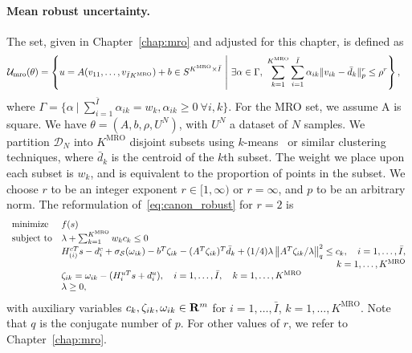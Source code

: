 \paragraph{Mean robust uncertainty.}
The  set, given in Chapter~\ref{chap:mro} and adjusted for this chapter, is defined as 
\begin{equation*}
	\begin{aligned}
		{\mathcal{U}}_{\text{mro}}(\theta) & = \left\{ u = A(v_{11},\dots,v_{\bar{I}K^{\text{MRO}}})+ b\in S^{K^{\text{MRO}}\times \bar{I}}~\middle|~\exists \alpha \in \Gamma,~\sum_{k=1}^{K^{\text{MRO}}} \sum_{i=1}^{\bar{I}} \alpha_{ik} \| v_{ik} - \bar{d}_k \|^r_p \le \rho^r \right\},
	\end{aligned}
\end{equation*}
where $\Gamma = \{\alpha~|~\sum_{i=1}^{\bar{I}}\alpha_{ik}= w_k, \alpha_{ik}\geq 0 ~\forall i,k\}$. For the MRO set, we assume A is square. We have $\theta = (A, b,\rho,U^N)$, with $U^N$ a dataset of $N$ samples. We partition ${\mathcal{D}}_N$ into $K^{\text{MRO}}$ disjoint subsets using $k$-means~\cite{kmeans} or similar clustering techniques, where $\bar{d}_k$ is the centroid of the $k$th subset. The weight we place upon each subset is $w_k$, and is equivalent to the proportion of points in the subset. We choose $r$ to be an integer exponent $r \in [1,\infty)$ or $r = \infty$, and $p$ to be an arbitrary norm. The reformulation of~\eqref{eq:canon_robust} for $r = 2$ is 
\begin{equation}
	\label{eq:mro_max}
	\begin{aligned}
		\begin{array}{ll}
			\text{minimize } & f(s)\\
			\mbox{subject to} & \lambda + \sum_{k=1}^{K^{\text{MRO}}} w_{k} c_{k}  \le 0\\
			& H^{cT}_{(i)}s - d_i^c + \sigma_\supp(\om_{ik}) - b^T\zeta_{ik} - (A^T\zeta_{ik})^T\bar{d}_k  + (1/4)\lambda \left\|A^T\zeta_{ik}/\lambda \right\|^2_q \leq c_k, \quad i = 1,\dots, \bar{I}, \\
   &\hfill \quad k = 1,\dots, K^{\text{MRO}}\\
			& \zeta_{ik} = \om_{ik} - (H_i^{uT}s + d_i^u), \quad i = 1,\dots, \bar{I},\quad k = 1,\dots, K^{\text{MRO}}\\
			& \lambda \geq 0,
		\end{array}
	\end{aligned}
\end{equation}
with auxiliary variables $c_k, \zeta_{ik}, \omega_{ik} \in {\mathbf R}^m$ for $i = 1,\dots,\bar{I}$, $k = 1,\dots, K^{\text{MRO}}$. 
Note that  $q$ is the conjugate number of $p$. For other values of $r$, we refer to Chapter~\ref{chap:mro}.

